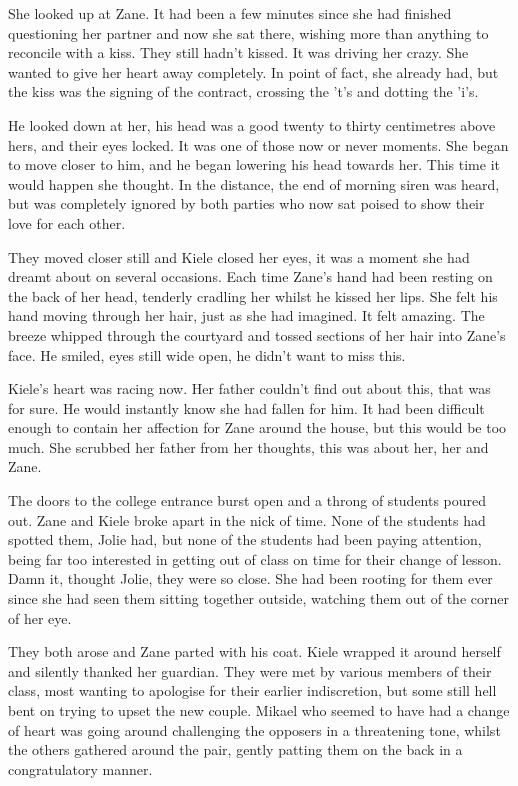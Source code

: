 She looked up at Zane.  It had been a few minutes since she had finished questioning her partner and now she sat there, wishing more than anything to reconcile with a kiss.  They still hadn't kissed.  It was driving her crazy.  She wanted to give her heart away completely.  In point of fact, she already had, but the kiss was the signing of the contract, crossing the 't's and dotting the 'i's.

He looked down at her, his head was a good twenty to thirty centimetres above hers, and their eyes locked.  It was one of those now or never moments.  She began to move closer to him, and he began lowering his head towards her.  This time it would happen she thought.  In the distance, the end of morning siren was heard, but was completely ignored by both parties who now sat poised to show their love for each other.

They moved closer still and Kiele closed her eyes, it was a moment she had dreamt about on several occasions.  Each time Zane's hand had been resting on the back of her head, tenderly cradling her whilst he kissed her lips.  She felt his hand moving through her hair, just as she had imagined.  It felt amazing.  The breeze whipped through the courtyard and tossed sections of her hair into Zane's face.  He smiled, eyes still wide open, he didn't want to miss this.  

Kiele's heart was racing now.  Her father couldn't find out about this, that was for sure.  He would instantly know she had fallen for him.  It had been difficult enough to contain her affection for Zane around the house, but this would be too much.  She scrubbed her father from her thoughts, this was about her, her and Zane.

The doors to the college entrance burst open and a throng of students poured out.  Zane and Kiele broke apart in the nick of time.  None of the students had spotted them, Jolie had, but none of the students had been paying attention, being far too interested in getting out of class on time for their change of lesson.  Damn it, thought Jolie, they were so close.  She had been rooting for them ever since she had seen them sitting together outside, watching them out of the corner of her eye.

They both arose and Zane parted with his coat.  Kiele wrapped it around herself and silently thanked her guardian.  They were met by various members of their class, most wanting to apologise for their earlier indiscretion, but some still hell bent on trying to upset the new couple.  Mikael who seemed to have had a change of heart was going around challenging the opposers in a threatening tone, whilst the others gathered around the pair, gently patting them on the back in a congratulatory manner.

